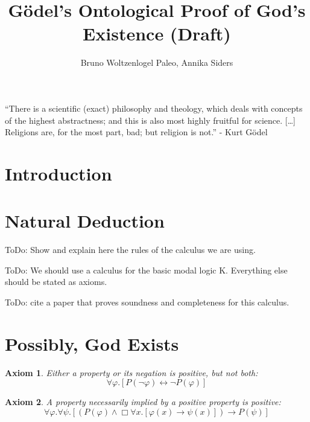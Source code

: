 \documentclass{article}
\author{Bruno Woltzenlogel Paleo, Annika Siders}
\title{G\"{o}del's Ontological Proof of God's Existence (Draft)}
\newtheorem{axiom}{Axiom}
\newcommand{\imp}{\rightarrow}
\newcommand{\biimp}{\leftrightarrow}
\newcommand{\all}{\forall}
\newcommand{\nec}{\Box} %
\begin{document}
\maketitle

\newcommand{\ess}[2]{#1 \ \mathit{ess} \ #2}
\newcommand{\NE}{E}


\noindent
``There is a scientific (exact) philosophy and theology,
which deals with concepts of the highest abstractness; and this is also most highly fruitful for science. [\ldots] Religions are, for the most part, bad; but religion is not.'' - Kurt G\"{o}del

\section{Introduction}

\section{Natural Deduction}

ToDo: Show and explain here the rules of the calculus we are using.

ToDo: We should use a calculus for the basic modal logic K. Everything else should be stated as axioms.

ToDo: cite a paper that proves soundness and completeness for this calculus.

\section{Possibly, God Exists}

\begin{axiom}
\label{A1}
Either a property or its negation is positive, but not both:
$$
\all \varphi. [P(\neg \varphi) \biimp \neg P(\varphi)]
$$
\end{axiom}

\begin{axiom}
\label{A2}
A property necessarily implied by a positive property is positive:
$$
\all \varphi. \all \psi.[(P(\varphi) \wedge \nec \all x.[\varphi(x) \imp \psi(x)]) \imp P(\psi)]
$$
\end{axiom}
\end{document}
